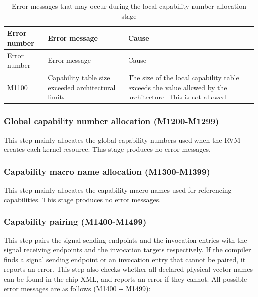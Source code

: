 \begin{xltabular}{\textwidth}{@{}>{\hsize\raggedright\arraybackslash}X>{\hsize\raggedright\arraybackslash}X>{\hsize\raggedright\arraybackslash}X@{}}
\caption{Error messages that may occur during the local capability number allocation stage}\label{tab:5-21}\\
\toprule
Error number & Error message & Cause\tabularnewline
\endfirsthead
\toprule
Error number & Error message & Cause\tabularnewline
\midrule
\endhead
\bottomrule
\endlastfoot
M1100 & Capability table size exceeded architectural limits. &
The size of the local capability table exceeds the value allowed by the architecture. This is not allowed.\tabularnewline
\end{xltabular}

\subsubsection{Global capability number allocation (M1200-M1299)}\label{subsubsec:5-6-5-3}

This step mainly allocates the global capability numbers used when the RVM creates each kernel resource. This stage produces no error messages.

\subsubsection{Capability macro name allocation (M1300-M1399)}\label{subsubsec:5-6-5-4}

This step mainly allocates the capability macro names used for referencing capabilities. This stage produces no error messages.

\subsubsection{Capability pairing (M1400-M1499)}\label{subsubsec:5-6-5-5}

This step pairs the signal sending endpoints and the invocation entries with the signal receiving endpoints and the invocation targets respectively. If the compiler finds a signal sending endpoint or an invocation entry that cannot be paired, it reports an error. This step also checks whether all declared physical vector names can be found in the chip XML, and reports an error if they cannot. All possible error messages are as follows (M1400
-\/- M1499):

